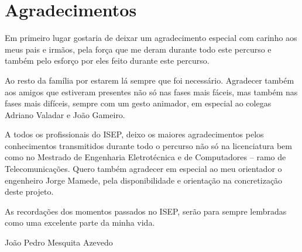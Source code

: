 \chapter*{Agradecimentos}

Em primeiro lugar gostaria de deixar um agradecimento especial com carinho aos meus pais e irmãos, pela força que me deram durante todo este percurso e também pelo esforço por eles feito durante este percurso.

Ao resto da família por estarem lá sempre que foi necessário.
Agradecer também aos amigos que estiveram presentes não só nas fases mais fáceis, mas também nas fases mais difíceis, sempre com um gesto animador, em especial ao colegas Adriano Valadar e João Gameiro.


A todos os profissionais do ISEP, deixo os maiores agradecimentos pelos conhecimentos transmitidos durante todo o percurso não só na licenciatura bem como no Mestrado de Engenharia Eletrotécnica e de Computadores – ramo de Telecomunicações. 
Quero também agradecer em especial ao meu orientador o engenheiro Jorge Mamede, pela disponibilidade e orientação na concretização deste projeto.
 
As recordações dos momentos passados no ISEP, serão para sempre lembradas como uma excelente parte da minha vida.


\vspace{10mm}
\begin{flushleft}
João Pedro Mesquita Azevedo
\end{flushleft}
